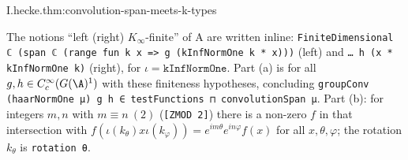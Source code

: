 \begin{tfformal}{I.hecke.thm:convolution-span-meets-k-types}
\begin{tffidelity}
The notions ``left (right) $K_\infty$-finite'' of A are written inline: \texttt{FiniteDimensional ℂ (span ℂ (range fun k x => g (kInfNormOne k * x)))} (left) and \texttt{… h (x * kInfNormOne k)} (right), for $\iota=\texttt{kInfNormOne}$. Part (a) is for all $g,h\in C_c^\infty(G(\A)^1)$ with these finiteness hypotheses, concluding \texttt{groupConv (haarNormOne μ) g h ∈ testFunctions ⊓ convolutionSpan μ}. Part (b): for integers $m,n$ with $m\equiv n\ (2)$ (\texttt{[ZMOD 2]}) there is a non-zero $f$ in that intersection with $f(\iota(k_\theta)x\iota(k_\varphi))=e^{im\theta}e^{in\varphi}f(x)$ for all $x,\theta,\varphi$; the rotation $k_\theta$ is \texttt{rotation θ}.
\end{tffidelity}
\end{tfformal}
